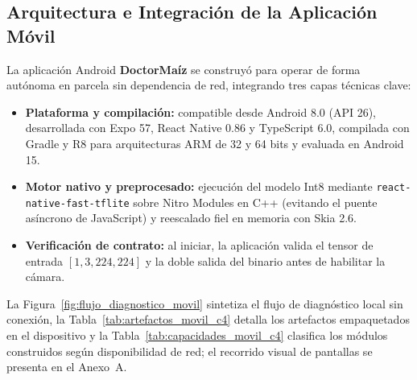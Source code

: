 \subsection{Arquitectura e Integraci\'on de la Aplicaci\'on M\'ovil}
La aplicaci\'on Android \textbf{DoctorMa\'iz} se construy\'o para operar de forma aut\'onoma en parcela sin dependencia de red, integrando tres capas t\'ecnicas clave:
\begin{itemize}\setlength{\itemsep}{2pt}
\item \textbf{Plataforma y compilaci\'on:} compatible desde Android 8.0 (API 26), desarrollada con Expo 57, React Native 0.86 y TypeScript 6.0, compilada con Gradle y R8 para arquitecturas ARM de 32 y 64 bits y evaluada en Android 15.
\item \textbf{Motor nativo y preprocesado:} ejecuci\'on del modelo Int8 mediante \texttt{react-native-fast-tflite} sobre Nitro Modules en C++ (evitando el puente as\'incrono de JavaScript) y reescalado fiel en memoria con Skia 2.6.
\item \textbf{Verificaci\'on de contrato:} al iniciar, la aplicaci\'on valida el tensor de entrada $[1,3,224,224]$ y la doble salida del binario antes de habilitar la c\'amara.
\end{itemize}

La Figura~\ref{fig:flujo_diagnostico_movil} sintetiza el flujo de diagn\'ostico local sin conexi\'on, la Tabla~\ref{tab:artefactos_movil_c4} detalla los artefactos empaquetados en el dispositivo y la Tabla~\ref{tab:capacidades_movil_c4} clasifica los m\'odulos construidos seg\'un disponibilidad de red; el recorrido visual de pantallas se presenta en el Anexo~A.

